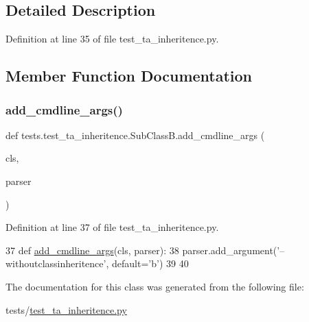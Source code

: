 \subsection{Detailed Description}


Definition at line 35 of file test\+\_\+ta\+\_\+inheritence.\+py.



\subsection{Member Function Documentation}
\mbox{\label{classtests_1_1test__ta__inheritence_1_1SubClassB_a9aa7384116305903fbf530d4710e83a3}} 
\subsubsection{\texorpdfstring{add\+\_\+cmdline\+\_\+args()}{add\_cmdline\_args()}}
{\footnotesize\ttfamily def tests.\+test\+\_\+ta\+\_\+inheritence.\+Sub\+Class\+B.\+add\+\_\+cmdline\+\_\+args (\begin{DoxyParamCaption}\item[{}]{cls,  }\item[{}]{parser }\end{DoxyParamCaption})}



Definition at line 37 of file test\+\_\+ta\+\_\+inheritence.\+py.


\begin{DoxyCode}
37     \textcolor{keyword}{def }\hyperlink{namespaceparlai_1_1agents_1_1drqa_1_1config_a62fdd5554f1da6be0cba185271058320}{add\_cmdline\_args}(cls, parser):
38         parser.add\_argument(\textcolor{stringliteral}{'--withoutclassinheritence'}, default=\textcolor{stringliteral}{'b'})
39 
40 
\end{DoxyCode}


The documentation for this class was generated from the following file\+:\begin{DoxyCompactItemize}
\item 
tests/\hyperlink{test__ta__inheritence_8py}{test\+\_\+ta\+\_\+inheritence.\+py}\end{DoxyCompactItemize}
